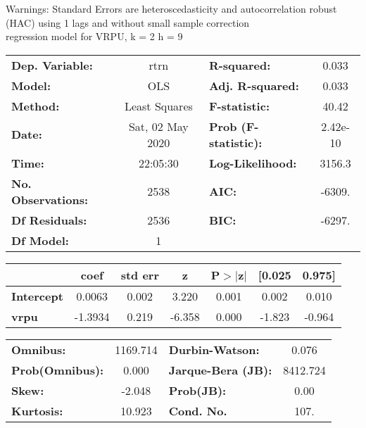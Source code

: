 Warnings: \newline
 [1] Standard Errors are heteroscedasticity and autocorrelation robust (HAC) using 1 lags and without small sample correction\\ 

regression model for VRPU, k = 2 h = 9\begin{center}
\begin{tabular}{lclc}
\toprule
\textbf{Dep. Variable:}    &       rtrn       & \textbf{  R-squared:         } &     0.033   \\
\textbf{Model:}            &       OLS        & \textbf{  Adj. R-squared:    } &     0.033   \\
\textbf{Method:}           &  Least Squares   & \textbf{  F-statistic:       } &     40.42   \\
\textbf{Date:}             & Sat, 02 May 2020 & \textbf{  Prob (F-statistic):} &  2.42e-10   \\
\textbf{Time:}             &     22:05:30     & \textbf{  Log-Likelihood:    } &    3156.3   \\
\textbf{No. Observations:} &        2538      & \textbf{  AIC:               } &    -6309.   \\
\textbf{Df Residuals:}     &        2536      & \textbf{  BIC:               } &    -6297.   \\
\textbf{Df Model:}         &           1      & \textbf{                     } &             \\
\bottomrule
\end{tabular}
\begin{tabular}{lcccccc}
                   & \textbf{coef} & \textbf{std err} & \textbf{z} & \textbf{P$> |$z$|$} & \textbf{[0.025} & \textbf{0.975]}  \\
\midrule
\textbf{Intercept} &       0.0063  &        0.002     &     3.220  &         0.001        &        0.002    &        0.010     \\
\textbf{vrpu}      &      -1.3934  &        0.219     &    -6.358  &         0.000        &       -1.823    &       -0.964     \\
\bottomrule
\end{tabular}
\begin{tabular}{lclc}
\textbf{Omnibus:}       & 1169.714 & \textbf{  Durbin-Watson:     } &    0.076  \\
\textbf{Prob(Omnibus):} &   0.000  & \textbf{  Jarque-Bera (JB):  } & 8412.724  \\
\textbf{Skew:}          &  -2.048  & \textbf{  Prob(JB):          } &     0.00  \\
\textbf{Kurtosis:}      &  10.923  & \textbf{  Cond. No.          } &     107.  \\
\bottomrule
\end{tabular}
\end{center}

